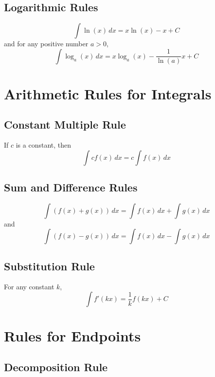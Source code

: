 \documentclass[
]{book}
\begin{document}
\hypertarget{logarithmic-rules-1}{%
\subsection{Logarithmic Rules}\label{logarithmic-rules-1}}

\[\int \ln (x) \, dx =x \ln(x) -x + C\]
and for any positive number \(a >0\),
\[\int \log_a (x) \, dx = x \log_a(x) - \frac{1}{\ln (a)} x + C \]

\hypertarget{arithmetic-rules-for-integrals}{%
\section{Arithmetic Rules for Integrals}\label{arithmetic-rules-for-integrals}}

\hypertarget{constant-multiple-rule-1}{%
\subsection{Constant Multiple Rule}\label{constant-multiple-rule-1}}

If \(c\) is a constant, then
\[\int  cf(x) \, dx =c \int f(x) \, dx\]

\hypertarget{sum-and-difference-rules-1}{%
\subsection{Sum and Difference Rules}\label{sum-and-difference-rules-1}}

\[\int (f(x)+g(x)) \,dx= \int f(x) \, dx + \int g(x)\, dx\]
and
\[\int (f(x)-g(x)) \,dx= \int f(x) \, dx - \int g(x)\, dx\]

\hypertarget{substitution-rule}{%
\subsection{Substitution Rule}\label{substitution-rule}}

For any constant \(k\),
\[\int f'(kx) = \frac{1}{k} f(kx) + C\]

\hypertarget{rules-for-endpoints}{%
\section{Rules for Endpoints}\label{rules-for-endpoints}}

\hypertarget{decomposition-rule}{%
\subsection{Decomposition Rule}\label{decomposition-rule}}
\end{document}

